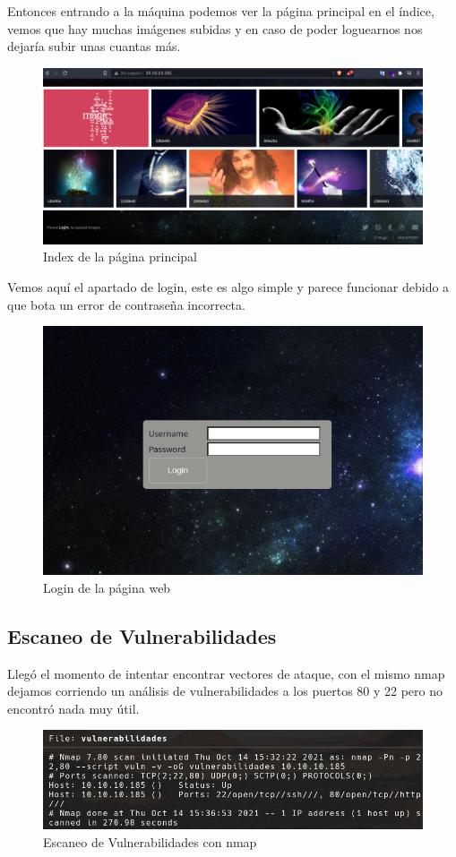 \documentclass{article}
\begin{document}
Entonces entrando a la máquina podemos ver la página principal en el índice, vemos que hay muchas imágenes subidas y en caso de poder loguearnos nos dejaría subir unas cuantas más.
\begin{figure}[h!]
	\center 
	\includegraphics[width=\textwidth]{images/magic/index.png}
	\caption{Index de la página principal}
\end{figure}
Vemos aquí el apartado de login, este es algo simple y parece funcionar debido a que bota un error de contraseña incorrecta.
\begin{figure}[h!]
	\center 
	\includegraphics[width=\textwidth]{images/magic/login.png}
	\caption{Login de la página web}
\end{figure}

\clearpage

\subsection{Escaneo de Vulnerabilidades}

Llegó el momento de intentar encontrar vectores de ataque, con el mismo nmap dejamos corriendo un análisis de vulnerabilidades a los puertos 80 y 22 pero no encontró nada muy útil.
\begin{figure}[h!]
	\center 
	\includegraphics[width=\textwidth]{images/magic/nmap-vuln.png}
	\caption{Escaneo de Vulnerabilidades con nmap}
\end{figure}
\end{document}
